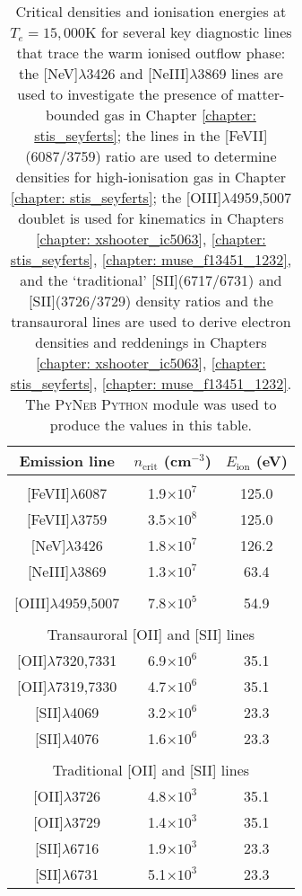 \begin{table}[ht!]
    \centering
    \renewcommand{\arraystretch}{1.2}
    \begin{tabular}{ccc}
    Emission line & $n_\mathrm{crit}$ (cm$^{-3}$) & $E_\mathrm{ion}$ (eV) \\ \hline
        &   &   \\
    {[}FeVII{]}$\lambda$6087 & 1.9$\times10^7$ & 125.0 \\  
    {[}FeVII{]}$\lambda$3759 & 3.5$\times10^8$ & 125.0 \\
    {[}NeV{]}$\lambda$3426 & 1.8$\times10^7$ & 126.2 \\  
    {[}NeIII{]}$\lambda$3869 & 1.3$\times10^7$  & 63.4 \\
        &   &   \\
    {[}OIII{]}$\lambda$4959,5007 & 7.8$\times10^5$ & 54.9 \\
        &   &   \\
    \multicolumn{3}{c}{Transauroral  {[}OII{]} and  {[}SII{]} lines} \\
    {[}OII{]}$\lambda$7320,7331 & 6.9$\times10^6$ & 35.1 \\
    {[}OII{]}$\lambda$7319,7330 & 4.7$\times10^6$ & 35.1 \\
    {[}SII{]}$\lambda$4069 & 3.2$\times10^6$ & 23.3 \\
    {[}SII{]}$\lambda$4076 & 1.6$\times10^6$ & 23.3 \\
        &   &   \\
    \multicolumn{3}{c}{Traditional  {[}OII{]} and  {[}SII{]} lines} \\
    {[}OII{]}$\lambda$3726 & 4.8$\times10^3$ & 35.1 \\
    {[}OII{]}$\lambda$3729 & 1.4$\times10^3$ & 35.1 \\ 
    {[}SII{]}$\lambda$6716 & 1.9$\times10^3$ & 23.3 \\
    {[}SII{]}$\lambda$6731 & 5.1$\times10^3$ & 23.3 \\
    \end{tabular}
    \caption[Critical densities and ionisation energies at $T_{e}=15,000$\;K for several key diagnostic lines that trace the warm ionised outflow phase.]{Critical densities and ionisation energies at $T_{e}=15,000$\;K for several key diagnostic lines that trace the warm ionised outflow phase: the [NeV]$\lambda$3426 and [NeIII]$\lambda$3869 lines are used to investigate the presence of matter-bounded gas in Chapter \ref{chapter: stis_seyferts}; the lines in the [FeVII](6087/3759) ratio are used to determine densities for high-ionisation gas in Chapter \ref{chapter: stis_seyferts}; the [OIII]$\lambda$4959,5007 doublet is used for kinematics in Chapters \ref{chapter: xshooter_ic5063}, \ref{chapter: stis_seyferts}, \ref{chapter: muse_f13451_1232}, and the `traditional' [SII](6717/6731) and [SII](3726/3729) density ratios and the transauroral lines are used to derive electron densities and reddenings in Chapters \ref{chapter: xshooter_ic5063}, \ref{chapter: stis_seyferts}, \ref{chapter: muse_f13451_1232}. The \textsc{PyNeb Python} module was used to produce the values in this table.}
    \label{tab: critical_densities}
\end{table}